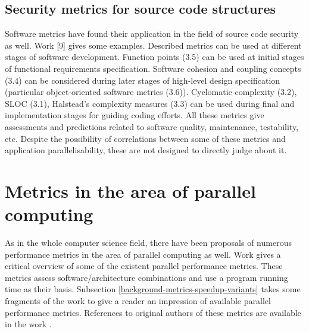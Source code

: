 \subsection{Security metrics for source code structures}
\qquad Software metrics have found their application in the field of source code security as well. Work [9] gives some examples. Described metrics can be used at different stages of software development. Function points (3.5) can be used at initial stages of functional requirements specification. Software cohesion and coupling concepts (3.4) can be considered during later stages of high-level design specification (particular object-oriented software metrics (3.6)). Cyclomatic complexity (3.2), SLOC (3.1), Halstead's complexity measures (3.3) can be used during final and implementation stages for guiding coding efforts. All these metrics give assessments and predictions related to software quality, maintenance, testability, etc. Despite the possibility of correlations between some of these metrics and application parallelisability, these are not designed to directly judge about it.

\section{Metrics in the area of parallel computing}
\label{background-metrics-parallel-computing}
\qquad As in the whole computer science field, there have been proposals of numerous performance metrics in the area of parallel computing as well. Work \cite{parallel-performance-metrics-paper} gives a critical overview of some of the existent parallel performance metrics. These metrics assess software/architecture combinations and use a program running time as their basis. Subsection \ref{background-metrics-speedup-variants} takes some fragments of the work \cite{parallel-performance-metrics-paper} to give a reader an impression of available parallel performance metrics. References to original authors of these metrics are available in the work \cite{parallel-performance-metrics-paper}.     

